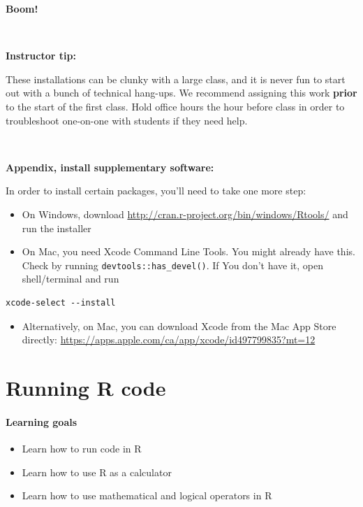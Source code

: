 \documentclass[
]{book}
\providecommand{\tightlist}{%
  \setlength{\itemsep}{0pt}\setlength{\parskip}{0pt}}
\begin{document}
\textbf{Boom!}

~

\leavevmode{}%
\textbf{Instructor tip:}

These installations can be clunky with a large class, and it is never fun to start out with a bunch of technical hang-ups. We recommend assigning this work \textbf{prior} to the start of the first class. Hold office hours the hour before class in order to troubleshoot one-on-one with students if they need help.

~

\textbf{Appendix, install supplementary software:}

In order to install certain packages, you'll need to take one more step:

\begin{itemize}
\tightlist
\item
  On Windows, download \url{http://cran.r-project.org/bin/windows/Rtools/} and run the installer
\item
  On Mac, you need Xcode Command Line Tools. You might already have this. Check by running \texttt{devtools::has\_devel()}. If You don't have it, open shell/terminal and run
\end{itemize}

\begin{verbatim}
xcode-select --install
\end{verbatim}

\begin{itemize}
\tightlist
\item
  Alternatively, on Mac, you can download Xcode from the Mac App Store directly: \url{https://apps.apple.com/ca/app/xcode/id497799835?mt=12}
\end{itemize}

\hypertarget{running-r-code}{%
\chapter{Running R code}\label{running-r-code}}

\hypertarget{learning-goals}{%
\subsubsection*{Learning goals}\label{learning-goals}}

\begin{itemize}
\tightlist
\item
  Learn how to run code in R
\item
  Learn how to use R as a calculator
\item
  Learn how to use mathematical and logical operators in R
\end{itemize}
\end{document}
